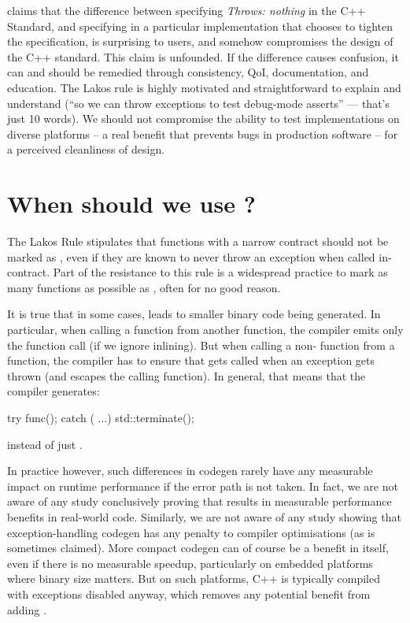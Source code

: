 \cite{P1656R2} claims that the difference between specifying \emph{Throws: nothing} in the C++ Standard, and specifying  in a particular implementation that chooses to tighten the specification, is surprising to users, and somehow compromises the design of the C++ standard. This claim is unfounded. If the difference causes confusion, it can and should be remedied through consistency, QoI, documentation, and education. The Lakos rule is highly motivated and straightforward to explain and understand (``so we can throw exceptions to test debug-mode asserts'' --- that's just 10 words). We should not compromise the ability to test implementations on diverse platforms -- a real benefit that prevents bugs in production software -- for a perceived cleanliness of design.

\section{When should we use ?}
\label{sec:noexcept}

The Lakos Rule stipulates that functions with a narrow contract should not be marked as , even if they are known to never throw an exception when called in-contract. Part of the resistance to this rule is a widespread practice to mark as many functions as possible as , often for no good reason.

It is true that in some cases,  leads to smaller binary code being generated. In particular, when calling a  function from another  function, the compiler emits only the function call (if we ignore inlining). But when calling a non- function from a  function, the compiler has to ensure that  gets called when an exception gets thrown (and escapes the calling function). In general, that means that the compiler generates:
\begin{codeblock}
try { func(); } catch ( ...) { std::terminate(); }
\end{codeblock}
instead of just .

In practice however, such differences in codegen rarely have any measurable impact on runtime performance if the error path is not taken. In fact, we are not aware of any study conclusively proving that  results in measurable performance benefits in real-world code. Similarly, we are not aware of any study showing that exception-handling codegen has any penalty to compiler optimisations (as is sometimes claimed). More compact codegen can of course be a benefit in itself, even if there is no measurable speedup, particularly on embedded platforms where binary size matters. But on such platforms, C++ is typically compiled with exceptions disabled anyway, which removes any potential benefit from adding .

